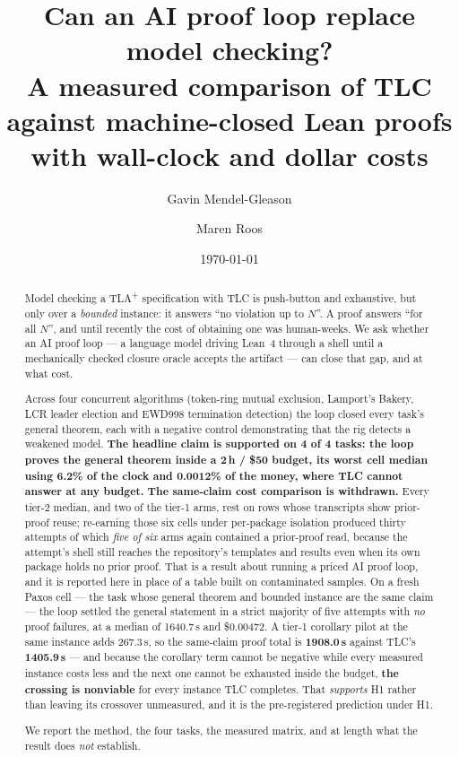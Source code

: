 \documentclass[11pt,a4paper]{article}
\title{\bfseries Can an AI proof loop replace model checking?\\[0.4em]
\large A measured comparison of TLC against machine-closed Lean proofs\\[0.2em]
\normalsize with wall-clock and dollar costs}
\author{Gavin Mendel-Gleason\and Maren Roos}
\date{\today}
\begin{document}
\maketitle

\begin{abstract}
\noindent
Model checking a TLA\textsuperscript{+} specification with TLC is push-button and exhaustive, but only
over a \emph{bounded} instance: it answers ``no violation up to $N$''. A proof answers ``for all $N$'',
and until recently the cost of obtaining one was human-weeks. We ask whether an AI proof loop --- a
language model driving Lean~4 through a shell until a mechanically checked closure oracle accepts the
artifact --- can close that gap, and at what cost.

Across four concurrent algorithms (token-ring mutual exclusion, Lamport's Bakery, LCR leader election
and EWD998 termination detection) the loop closed every task's general theorem, each with a negative
control demonstrating that the rig detects a weakened model. \textbf{The headline claim is supported on
4 of 4 tasks: the loop proves the general theorem inside a 2\,h / \$50 budget, its worst cell median
using 6.2\% of the clock and 0.0012\% of the money, where TLC cannot answer at any budget.}
\textbf{The same-claim cost comparison is withdrawn.} Every tier-2 median, and two of the tier-1 arms,
rest on rows whose transcripts show prior-proof reuse; re-earning those six cells under per-package
isolation produced thirty attempts of which \emph{five of six} arms again contained a prior-proof read,
because the attempt's shell still reaches the repository's templates and results even when its own package
holds no prior proof. That is a result about running a priced AI proof loop, and it is reported here in
place of a table built on contaminated samples. On a fresh Paxos cell --- the task whose general theorem
and bounded instance are the same claim --- the loop settled the general statement in a strict majority of
five attempts with \emph{no} proof failures, at a median of 1640.7\,s and \$0.00472. A tier-1 corollary
pilot at the same instance adds 267.3\,s, so the same-claim proof total is \textbf{1908.0\,s} against
TLC's \textbf{1405.9\,s} --- and because the corollary term cannot be negative while every measured
instance costs less and the next one cannot be exhausted inside the budget, \textbf{the crossing is
nonviable} for every instance TLC completes. That \emph{supports} H1 rather than leaving its crossover
unmeasured, and it is the pre-registered prediction under H1.

We report the method, the four tasks, the measured matrix, and at length what the result does
\emph{not} establish.
\end{abstract}
\end{document}
